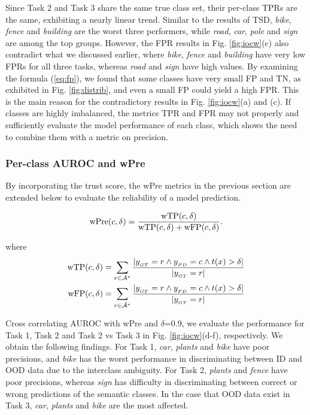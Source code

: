\documentclass[journal]{IEEEtran}
\begin{document}
Since Task 2 and Task 3 share the same true class set, their per-class TPRs are the same, exhibiting a nearly linear trend.
Similar to the results of TSD, \textit{bike}, \textit{fence} and \textit{building} are the worst three performers, while \textit{road}, \textit{car}, \textit{pole} and \textit{sign} are among the top groups.
However, the FPR results in Fig. \ref{fig:iocw}(c) also contradict what we discussed earlier, where \textit{bike}, \textit{fence} and \textit{building} have very low FPRs for all three tasks, whereas \textit{road} and \textit{sign} have high values.
By examining the formula (\ref{eq:fp}), we found that some classes have very small FP and TN, as exhibited in Fig. \ref{fig:distrib}, and even a small FP could yield a high FPR. This is the main reason for the contradictory results in Fig. \ref{fig:iocw}(a) and (c). 
If classes are highly imbalanced, the metrics TPR and FPR may not properly and sufficiently evaluate the model performance of each class, which shows the need to combine them with a metric on precision.

\subsubsection{Per-class AUROC and wPre}

By incorporating the trust score, the wPre metrics in the previous section are extended below to evaluate the reliability of a model prediction.

\begin{equation}
{\rm wPre}(c,\delta) = \frac{{\rm wTP}(c,\delta)}{{\rm wTP}(c,\delta)+{\rm wFP}(c,\delta)}.
\end{equation}

where
\begin{eqnarray}
{\rm wTP}(c,\delta) = \sum_{r\in \mathcal{A}^*} { \frac{|y_{_{GT}}=r \land y_{_{PD}}=c \land t(x) > \delta|}{|y_{_{GT}}=r|} }\\
{\rm wFP}(c,\delta) = \sum_{r\in \mathcal{\bar{A}}^*} { \frac{|y_{_{GT}}=r \land y_{_{PD}}=c \land t(x) > \delta|}{|y_{_{GT}}=r|} }
\end{eqnarray}

Cross correlating AUROC with wPre and $\delta$=0.9, we evaluate the performance for Task 1, Task 2 and Task 2 vs Task 3 in Fig. \ref{fig:iocw}(d-f), respectively. 
We obtain the following findings. For Task 1, \textit{car}, \textit{plants} and \textit{bike} have poor precisions, and \textit{bike} has the worst performance in discriminating between ID and OOD data due to the interclass ambiguity. For Task 2, \textit{plants} and \textit{fence} have poor precisions, whereas \textit{sign} has difficulty in discriminating between correct or wrong predictions of the semantic classes. In the case that OOD data exist in Task 3, \textit{car}, \textit{plants} and \textit{bike} are the most affected.
\end{document}
